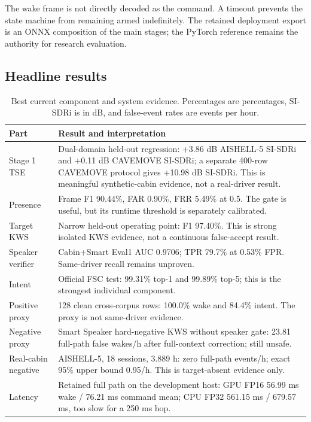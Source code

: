 \documentclass[11pt,a4paper]{article}
\begin{document}
The wake frame is not directly decoded as the command. A timeout prevents
the state machine from remaining armed indefinitely. The retained deployment
export is an ONNX composition of the main stages; the PyTorch reference
remains the authority for research evaluation.

\subsection{Headline results}

\begin{table}[H]
\centering
\caption{Best current component and system evidence. Percentages are
percentages, SI-SDRi is in dB, and false-event rates are events per hour.}
\label{tab:headline}
\footnotesize
\begin{tabularx}{\linewidth}{@{}p{2.6cm}Y@{}}
\toprule
\textbf{Part} & \textbf{Result and interpretation}\\
\midrule
Stage 1 TSE & Dual-domain held-out regression: +3.86 dB AISHELL-5 SI-SDRi and +0.11 dB CAVEMOVE SI-SDRi; a separate 400-row CAVEMOVE protocol gives +10.98 dB SI-SDRi. This is meaningful synthetic-cabin evidence, not a real-driver result.\\
Presence & Frame F1 90.44\%, FAR 0.90\%, FRR 5.49\% at 0.5. The gate is useful, but its runtime threshold is separately calibrated.\\
Target KWS & Narrow held-out operating point: F1 97.40\%. This is strong isolated KWS evidence, not a continuous false-accept result.\\
Speaker verifier & Cabin+Smart Eval1 AUC 0.9706; TPR 79.7\% at 0.53\% FPR. Same-driver recall remains unproven.\\
Intent & Official FSC test: 99.31\% top-1 and 99.89\% top-5; this is the strongest individual component.\\
Positive proxy & 128 clean cross-corpus rows: 100.0\% wake and 84.4\% intent. The proxy is not same-driver evidence.\\
Negative proxy & Smart Speaker hard-negative KWS without speaker gate: 23.81 full-path false wakes/h after full-context correction; still unsafe.\\
Real-cabin negative & AISHELL-5, 18 sessions, 3.889 h: zero full-path events/h; exact 95\% upper bound 0.95/h. This is target-absent evidence only.\\
Latency & Retained full path on the development host: GPU FP16 56.99 ms wake / 76.21 ms command mean; CPU FP32 561.15 ms / 679.57 ms, too slow for a 250 ms hop.\\
\bottomrule
\end{tabularx}
\end{table}
\end{document}
